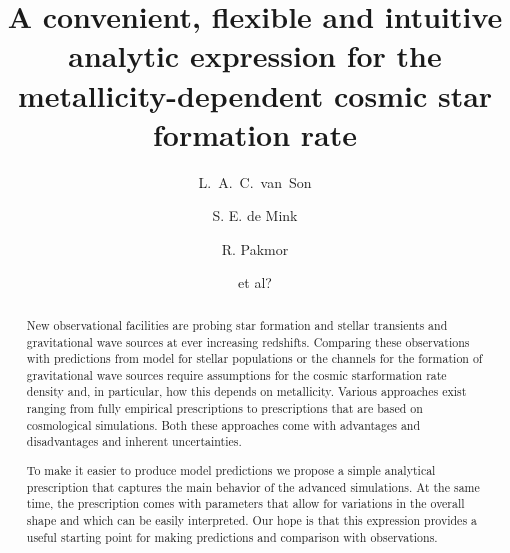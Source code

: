 \documentclass[twocolumn]{aastex631}
\begin{document}
\title{ A convenient, flexible and intuitive analytic expression for the metallicity-dependent cosmic star formation rate  }


\author[0000-0001-5484-4987]{L.~A.~C.~van~Son}

 \author[0000-0001-9336-2825]{S. E. de Mink}

 \author[0000-0003-3308-2420]{R. Pakmor}
 
\author{et al?}


\begin{abstract}
New observational facilities are probing star formation and stellar transients and gravitational wave sources at ever increasing redshifts. Comparing these observations with predictions from model for stellar populations or the channels for the formation of gravitational wave sources require assumptions for the cosmic starformation rate density and, in particular, how this depends on metallicity.  Various approaches exist ranging from fully empirical prescriptions to prescriptions that are based on cosmological simulations. Both these approaches come with advantages and disadvantages and inherent uncertainties. 

To make it easier to produce model predictions we propose a simple analytical prescription that captures the main behavior of the advanced simulations. At the same time, the prescription comes with parameters that allow for variations in the overall shape and which can be easily interpreted. Our hope is that this expression provides a useful starting point for making predictions and comparison with observations. 
\end{abstract}
\end{document}
